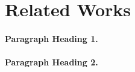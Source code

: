 \section{Related Works}
\label{sec: review}

\paragraph{Paragraph Heading 1.}
\label{para: heading_1}
\lipsum[4]

\paragraph{Paragraph Heading 2.}
\label{para: heading_2}
\lipsum[5]
